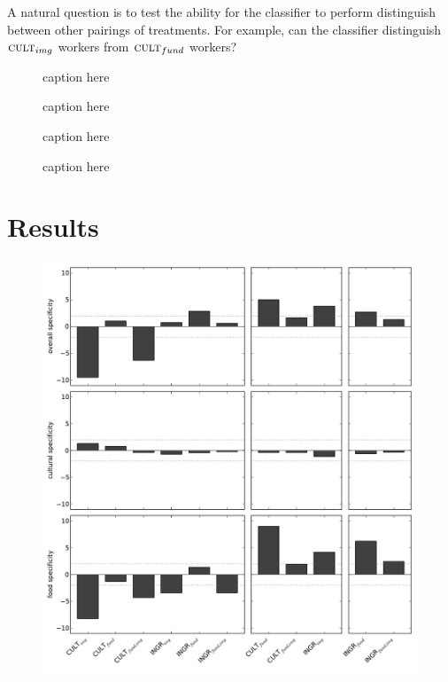 \documentclass[letterpaper, 11pt, twocolumn]{article}
\begin{document}
A natural question is to test the ability for the classifier to perform 
distinguish between other pairings of treatments.  For example, can the 
classifier distinguish $\textsc{cult}_{img}$ workers from 
$\textsc{cult}_{fund}$ workers?

\begin{figure}
	\caption{caption here}
	\label{fig:testImages}
\end{figure}

\begin{figure}
	\caption{caption here}
	\label{fig:ambiguous}
\end{figure}

\begin{figure}
	\caption{caption here}
	\label{fig:cultural}
\end{figure}

\begin{figure}
	\caption{caption here}
	\label{fig:ingredients}
\end{figure}

\section*{Results}
\begin{figure}
	\includegraphics[scale=0.65]{../figs/specificity2.pdf}
\end{figure}



\end{document}
